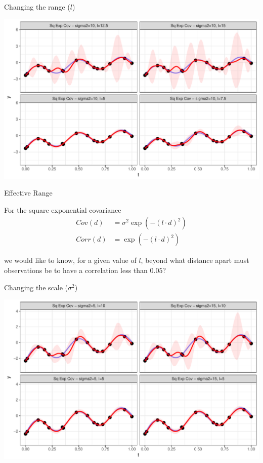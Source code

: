 \documentclass[11pt,ignorenonframetext,]{beamer}
\begin{document}
\begin{frame}{Changing the range (\(l\))}

\includegraphics{Lec12_files/figure-beamer/unnamed-chunk-14-1.pdf}

\end{frame}

\begin{frame}[t]{Effective Range}

For the square exponential covariance \[ \begin{aligned} 
Cov(d) &= \sigma^2 \exp\left(-(l \cdot d)^2\right) \\
Corr(d) &= \exp\left(-(l \cdot d)^2\right)
\end{aligned} \]

we would like to know, for a given value of \(l\), beyond what distance
apart must observations be to have a correlation less than \(0.05\)?

\end{frame}

\begin{frame}{Changing the scale (\(\sigma^2\))}

\includegraphics{Lec12_files/figure-beamer/unnamed-chunk-15-1.pdf}

\end{frame}
\end{document}
